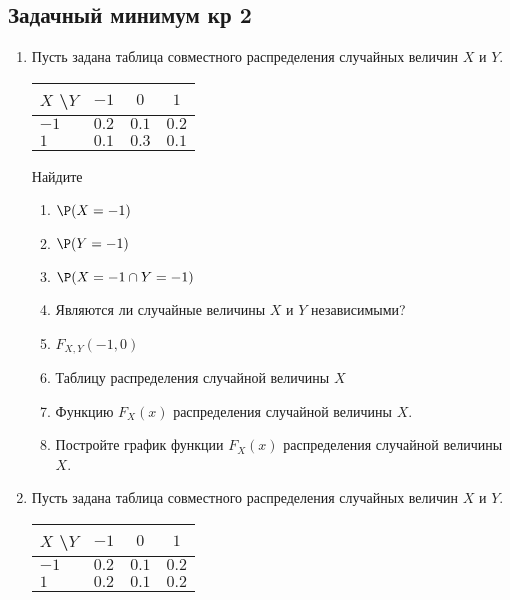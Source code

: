\subsection{Задачный минимум кр 2}

\begin{enumerate}

\item Пусть задана таблица совместного распределения случайных величин $X$ и $Y$.

\begin{center}\begin{tabular}{lccc}
\toprule
 $X$ \textbackslash $Y$    & $-1$  & $0$   & $1$   \\ \midrule
$-1$                 & $0.2$ & $0.1$ & $0.2$ \\
 $1$                 & $0.1$ & $0.3$ & $0.1$ \\ \bottomrule
\end{tabular}\end{center}


Найдите
\begin{enumerate}
\item $\P(X = -1)$
\item $\P(Y = -1)$
\item $\P(X = -1 \cap Y = -1 )$
\item Являются ли случайные величины $X$ и $Y$ независимыми?
\item $F_{X,Y}(-1,0)$
\item Таблицу распределения случайной величины $X$
\item Функцию $F_{X}(x)$ распределения случайной величины $X$.
\item Постройте график функции $F_{X}(x)$ распределения случайной величины $X$.
\end{enumerate}

\item Пусть задана таблица совместного распределения случайных величин $X$ и $Y$.


\begin{center}\begin{tabular}{lccc}
\toprule
 $X$ \textbackslash $Y$    & $-1$  & $0$  & $1$   \\ \midrule
$-1$                 & $0.2$ & $0.1$ & $0.2$ \\
 $1$                 & $0.2$ & $0.1$ & $0.2$ \\ \bottomrule
\end{tabular}\end{center}


\end{enumerate}
